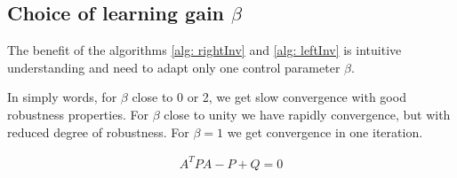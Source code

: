 \subsection{Choice of  learning gain $\beta$}
The benefit of the algorithms \ref{alg: rightInv} and \ref{alg: leftInv} is intuitive understanding and  need to adapt only one control parameter $\beta$. 

In simply words, for $\beta$ close to 0 or 2, we get slow convergence
with good robustness properties. For $\beta$ close to unity we have rapidly convergence,
but with reduced degree of robustness. For $\beta = 1$ we get convergence in one iteration.



\begin{align}
A^T P A - P + Q = 0
\end{align}













 